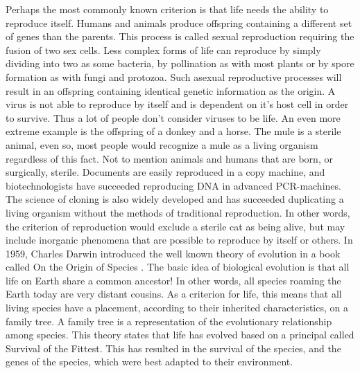 Perhaps the most commonly known criterion is that life needs the ability to reproduce itself. Humans and animals produce offspring containing a different set of genes than the parents. This process is called sexual reproduction requiring the fusion of two sex cells. Less complex forms of life can reproduce by simply dividing into two as some bacteria, by pollination as with most plants or by spore formation as with fungi and protozoa. Such asexual reproductive processes will result in an offspring containing identical genetic information as the origin. A virus is not able to reproduce by itself and is dependent on it's host cell in order to survive. Thus a lot of people don't consider viruses to be life. An even more extreme example is the offspring of a donkey and a horse. The mule is a sterile animal, even so, most people would recognize a mule as a living organism regardless of this fact. Not to mention animals and humans
that are born, or surgically, sterile. Documents are easily reproduced in a copy machine, and biotechnologists have succeeded reproducing DNA in advanced PCR-machines. The science of cloning is also widely developed and has succeeded duplicating a living organism without the methods of traditional reproduction. In other words, the criterion of reproduction would exclude a sterile cat as being alive, but may include inorganic phenomena that are possible to reproduce by itself or others.
In 1959, Charles Darwin introduced the well known theory of evolution in a book called On the Origin of Species \cite{Darwin}. The basic idea of biological evolution is that all life on Earth share a common ancestor! In other words, all species roaming the Earth today are very distant cousins. As a criterion for life, this means that all living species have a placement, according to their inherited characteristics, on a family tree. A family tree is a representation of the evolutionary relationship among species. This theory states that life has evolved based on a principal called Survival of the Fittest. This has resulted in the survival of the species, and the genes of the species, which were best adapted to their environment. 


